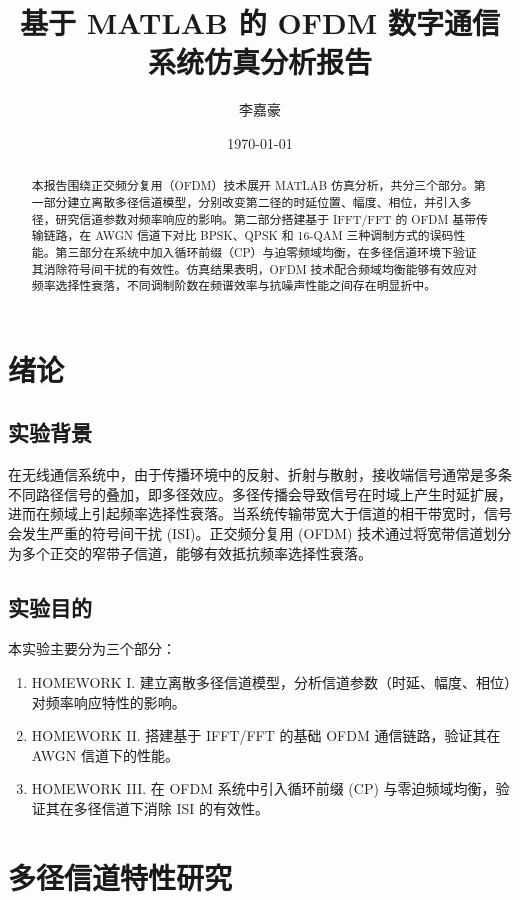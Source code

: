 \documentclass[a4paper, 11pt]{ctexart}
\title{\textbf{基于 MATLAB 的 OFDM 数字通信系统仿真分析报告}}
\author{李嘉豪 \quad 3023234059}
\date{\today}
\begin{document}
\maketitle

\begin{abstract}
本报告围绕正交频分复用（OFDM）技术展开 MATLAB 仿真分析，共分三个部分。第一部分建立离散多径信道模型，分别改变第二径的时延位置、幅度、相位，并引入多径，研究信道参数对频率响应的影响。第二部分搭建基于 IFFT/FFT 的 OFDM 基带传输链路，在 AWGN 信道下对比 BPSK、QPSK 和 16-QAM 三种调制方式的误码性能。第三部分在系统中加入循环前缀（CP）与迫零频域均衡，在多径信道环境下验证其消除符号间干扰的有效性。仿真结果表明，OFDM 技术配合频域均衡能够有效应对频率选择性衰落，不同调制阶数在频谱效率与抗噪声性能之间存在明显折中。
\end{abstract}

\section{绪论}

\subsection{实验背景}
在无线通信系统中，由于传播环境中的反射、折射与散射，接收端信号通常是多条不同路径信号的叠加，即多径效应。多径传播会导致信号在时域上产生时延扩展，进而在频域上引起频率选择性衰落。当系统传输带宽大于信道的相干带宽时，信号会发生严重的符号间干扰 (ISI)。正交频分复用 (OFDM) 技术通过将宽带信道划分为多个正交的窄带子信道，能够有效抵抗频率选择性衰落。

\subsection{实验目的}
本实验主要分为三个部分：
\begin{enumerate}
    \item HOMEWORK I. 建立离散多径信道模型，分析信道参数（时延、幅度、相位）对频率响应特性的影响。
    \item HOMEWORK II. 搭建基于 IFFT/FFT 的基础 OFDM 通信链路，验证其在 AWGN 信道下的性能。
    \item HOMEWORK III. 在 OFDM 系统中引入循环前缀 (CP) 与零迫频域均衡，验证其在多径信道下消除 ISI 的有效性。
\end{enumerate}

\section{多径信道特性研究}
\end{document}
